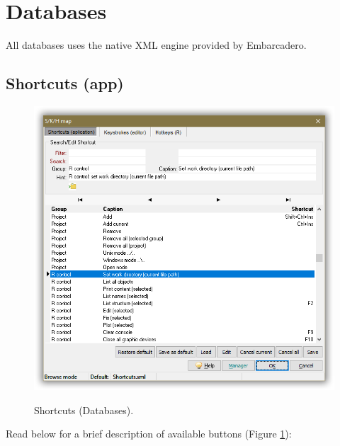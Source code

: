 
\hypertarget{working_databases}{}
\section{Databases}

All databases uses the native XML engine provided by Embarcadero.

\subsection{Shortcuts (app)}

\begin{figure}[H]
  \includegraphics[scale=0.35]{./res/shortcuts_dlg.png}\\
  \caption{Shortcuts (Databases).}
  \label{fig:shortcuts_dlg_2}
\end{figure}

Read below for a brief description of available buttons (Figure \ref{fig:shortcuts_dlg_2}):

